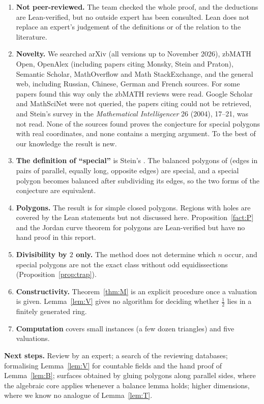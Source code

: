 \documentclass[11pt]{article}
\theoremstyle{definition}
\begin{document}
\begin{enumerate}
\item \textbf{Not peer-reviewed.} The team checked the whole proof, and the deductions are
Lean-verified, but no outside expert has been consulted. Lean does not replace an expert's
judgement of the definitions or of the relation to the literature.
\item \textbf{Novelty.} We searched arXiv (all versions up to November 2026), zbMATH Open,
OpenAlex (including papers citing Monsky, Stein and Praton), Semantic Scholar, MathOverflow and
Math StackExchange, and the general web, including Russian, Chinese, German and French sources.
For some papers found this way only the zbMATH reviews were read. Google Scholar and MathSciNet
were not queried, the papers citing \cite{Rud} could not be retrieved, and Stein's survey in the
\emph{Mathematical Intelligencer} 26 (2004), 17--21, was not read. None of the sources found proves
the conjecture for special polygons with real coordinates, and none contains a merging argument. To
the best of our knowledge the result is new.
\item \textbf{The definition of ``special''} is Stein's \cite[p.~141]{Ste00}. The balanced polygons
of \cite{Rud12} (edges in pairs of parallel, equally long, opposite edges) are special, and a special
polygon becomes balanced after subdividing its edges, so the two forms of the conjecture are
equivalent.
\item \textbf{Polygons.} The result is for simple closed polygons. Regions with holes are covered by
the Lean statements but not discussed here. Proposition~\ref{fact:P} and the Jordan curve theorem for
polygons are Lean-verified but have no hand proof in this report.
\item \textbf{Divisibility by $2$ only.} The method does not determine which $n$ occur, and special
polygons are not the exact class without odd equidissections (Proposition~\ref{prop:trap}).
\item \textbf{Constructivity.} Theorem~\ref{thm:M} is an explicit procedure once a valuation is
given. Lemma~\ref{lem:V} gives no algorithm for deciding whether $\tfrac12$ lies in a finitely
generated ring.
\item \textbf{Computation} covers small instances (a few dozen triangles) and five valuations.
\end{enumerate}

\textbf{Next steps.} Review by an expert; a search of the reviewing databases; formalising
Lemma~\ref{lem:V} for countable fields and the hand proof of Lemma~\ref{lem:B}; surfaces obtained
by gluing polygons along parallel sides, where the algebraic core applies whenever a balance lemma
holds; higher dimensions, where we know no analogue of Lemma~\ref{lem:T}.
\end{document}
